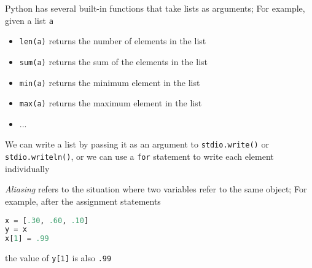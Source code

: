\documentclass[8pt,a4paper,compress]{beamer}
\begin{document}
\begin{frame}[fragile]
Python has several built-in functions that take lists as arguments; For example, given a list \lstinline{a}
\begin{itemize}
\item \lstinline{len(a)} returns the number of elements in the list
\item \lstinline{sum(a)} returns the sum of the elements in the list
\item \lstinline{min(a)} returns the minimum element in the list
\item \lstinline{max(a)} returns the maximum element in the list
\item ...
\end{itemize}

\bigskip

We can write a list by passing it as an argument to \lstinline{stdio.write()} or \lstinline{stdio.writeln()}, or we can use a \lstinline{for} statement to write each element individually

\bigskip

\emph{Aliasing} refers to the situation where two variables refer to the same object; For example, after the assignment statements
\begin{lstlisting}[language=Python]
x = [.30, .60, .10]
y = x
x[1] = .99
\end{lstlisting}
the value of \lstinline{y[1]} is also \lstinline{.99}
\end{frame}
\end{document}
